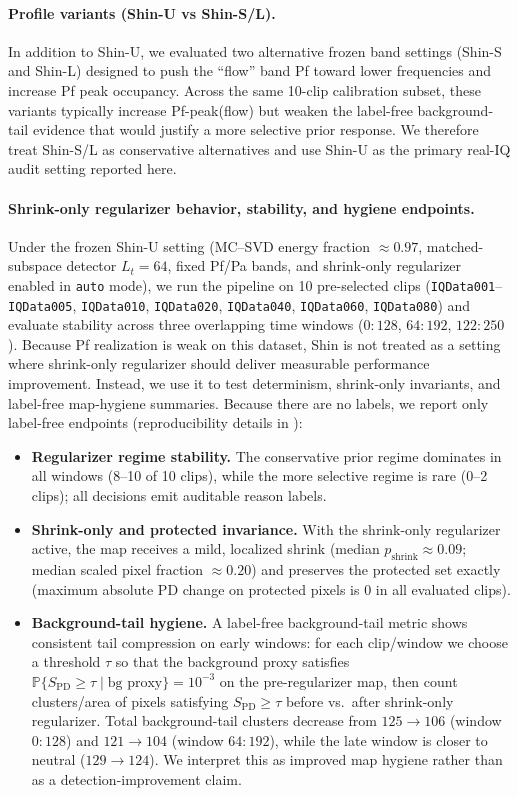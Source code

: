 \paragraph{Profile variants (Shin-U vs Shin-S/L).}
In addition to Shin-U, we evaluated two alternative frozen band settings (Shin-S and Shin-L) designed to push the ``flow'' band Pf toward lower frequencies and increase Pf peak occupancy. Across the same 10-clip calibration subset, these variants typically increase Pf-peak(flow) but weaken the label-free background-tail evidence that would justify a more selective prior response. We therefore treat Shin-S/L as conservative alternatives and use Shin-U as the primary real-IQ audit setting reported here.

\paragraph{Shrink-only regularizer behavior, stability, and hygiene endpoints.}
Under the frozen Shin-U setting (MC--SVD energy fraction $\approx 0.97$, matched-subspace detector $L_t=64$, fixed Pf/Pa bands, and shrink-only regularizer enabled in \texttt{auto} mode), we run the pipeline on 10 pre-selected clips (\texttt{IQData001}--\texttt{IQData005}, \texttt{IQData010}, \texttt{IQData020}, \texttt{IQData040}, \texttt{IQData060}, \texttt{IQData080}) and evaluate stability across three overlapping time windows ($0{:}128$, $64{:}192$, $122{:}250$). Because Pf realization is weak on this dataset, Shin is not treated as a setting where shrink-only regularizer should deliver measurable performance improvement. Instead, we use it to test determinism, shrink-only invariants, and label-free map-hygiene summaries. Because there are no labels, we report only label-free endpoints (reproducibility details in ):
\begin{itemize}[nosep]
  \item \textbf{Regularizer regime stability.} The conservative prior regime dominates in all windows (8--10 of 10 clips), while the more selective regime is rare (0--2 clips); all decisions emit auditable reason labels.
  \item \textbf{Shrink-only and protected invariance.} With the shrink-only regularizer active, the map receives a mild, localized shrink (median $p_{\mathrm{shrink}}\approx 0.09$; median scaled pixel fraction $\approx 0.20$) and preserves the protected set exactly (maximum absolute PD change on protected pixels is $0$ in all evaluated clips).
  \item \textbf{Background-tail hygiene.} A label-free background-tail metric shows consistent tail compression on early windows: for each clip/window we choose a threshold $\tau$ so that the background proxy satisfies $\mathbb{P}\{S_{\mathrm{PD}}\ge\tau\mid \text{bg proxy}\}=10^{-3}$ on the pre-regularizer map, then count clusters/area of pixels satisfying $S_{\mathrm{PD}}\ge\tau$ before vs.\ after shrink-only regularizer. Total background-tail clusters decrease from $125\rightarrow 106$ (window $0{:}128$) and $121\rightarrow 104$ (window $64{:}192$), while the late window is closer to neutral ($129\rightarrow 124$). We interpret this as improved map hygiene rather than as a detection-improvement claim.
\end{itemize}

